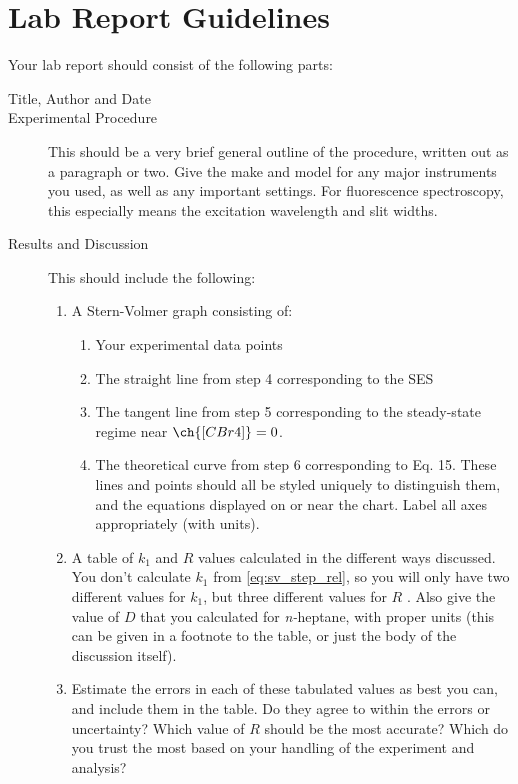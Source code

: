 \section{Lab Report Guidelines} %
\label{sec:lab_report_guidelines}

Your lab report should consist of the following parts:
\begin{description}
	\item[Title, Author and Date]
	\item[Experimental Procedure] This should be a very brief general outline of the procedure, written out as a paragraph or two. Give the make and model for any major instruments you used, as well as any important settings. For fluorescence spectroscopy, this especially means the excitation wavelength and slit widths.
	\item[Results and Discussion] This should include the following:
	\begin{enumerate}
		\item A Stern-Volmer graph consisting of:
		\begin{enumerate}
			\item Your experimental data points
			\item The straight line from step 4 corresponding to the SES
			\item The tangent line from step 5 corresponding to the steady-state regime near \( \ch{[CBr4]} = 0 \).
			\item The theoretical curve from step 6 corresponding to Eq. 15. 
			These lines and points should all be styled uniquely to distinguish them, and the equations displayed on or near the chart. 
			Label all axes appropriately (with units).
		\end{enumerate}
		\item A table of \( k_1 \) and \( R \) values calculated in the different ways discussed. 
		You don’t calculate \( k_1 \) from \cref{eq:sv_step_rel}, so you will only have two different values for \( k_1 \), but three different values for \( R \) . 
		Also give the value of \( D \) that you calculated for \emph{n-}heptane, with proper units (this can be given in a footnote to the table, or just the body of the discussion itself).
		\item Estimate the errors in each of these tabulated values as best you can, and include them in the table. 
		Do they agree to within the errors or uncertainty? 
		Which value of \( R \) should be the most accurate? 
		Which do you trust the most based on your handling of the experiment and analysis?

\end{enumerate}
\end{description}

